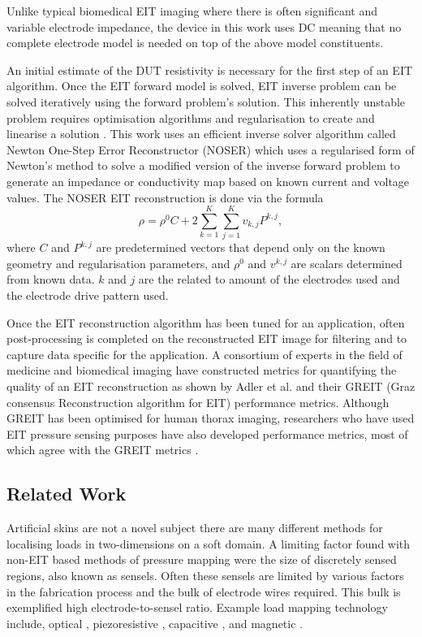 Unlike typical biomedical EIT imaging where there is often significant and variable electrode impedance, the device in this work uses DC meaning that no complete electrode model is needed on top of the above model constituents.

An initial estimate of the DUT resistivity is necessary for the first step of an EIT algorithm. Once the EIT forward model is solved, EIT inverse problem can be solved iteratively using the forward problem's solution. This inherently unstable problem requires optimisation algorithms and regularisation to create and linearise a solution \citep{Bayford2018,Lionheart2003,Martins2019,Adler2021}. This work uses an efficient inverse solver algorithm called Newton One-Step Error Reconstructor (NOSER) which uses a regularised form of Newton's method to solve a modified version of the inverse forward problem to generate an impedance or conductivity map based on known current and voltage values\cite{Cheney1999}. The NOSER EIT reconstruction is done via the formula
\begin{equation}
	\rho = \rho^0 C + 2 \sum_{k=1}^{K}\sum_{j=1}^{K} v_{k,j} P^{k,j},
\end{equation}
where $C$ and $P^{k,j}$ are predetermined vectors that depend only on the known geometry and regularisation parameters, and $\rho^0$ and $v^{k,j}$ are scalars determined from known data. $k$ and $j$ are the related to amount of the electrodes used and the electrode drive pattern used.

Once the EIT reconstruction algorithm has been tuned for an application, often post-processing is completed on the reconstructed EIT image for filtering and to capture data specific for the application. A consortium of experts in the field of medicine and biomedical imaging  have constructed metrics for quantifying the quality of an EIT reconstruction as shown by Adler et al. \citep{Adler2009} and their GREIT (Graz consensus Reconstruction algorithm for EIT) performance metrics. Although GREIT has been optimised for human thorax imaging, researchers who have used EIT pressure sensing purposes have also developed performance metrics, most of which agree with the GREIT metrics \citep{Wang2020,Silvera-Tawil2015,Visentin2016,Tallman2020,Sun2020,Hassan2009,Kato2007}.

\subsection{Related Work} \label{sec:Related Work}
Artificial skins are not a novel subject there are many different methods for localising loads in two-dimensions on a soft domain. A limiting factor found with non-EIT based methods of pressure mapping were the size of discretely sensed regions, also known as sensels. Often these sensels are limited by various factors in the fabrication process and the bulk of electrode wires required. This bulk is exemplified high electrode-to-sensel ratio. Example load mapping technology include, optical \citep{Ramuz2012,Shimadera2022,Rossiter2005}, piezoresistive \citep{Gilanizadehdizaj2022,Fu2020,Yang2022}, capacitive \citep{Liang2015}, and magnetic \citep{Yan2021}.


